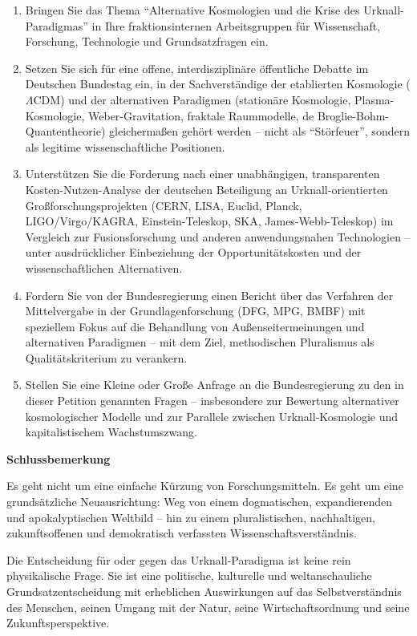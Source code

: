 \documentclass[11pt,a4paper]{letter}
\begin{document}
\begin{letter}
\begin{enumerate}
    \item Bringen Sie das Thema \enquote{Alternative Kosmologien und die Krise des Urknall-Paradigmas} in Ihre fraktionsinternen Arbeitsgruppen für Wissenschaft, Forschung, Technologie und Grundsatzfragen ein.
    
    \item Setzen Sie sich für eine offene, interdisziplinäre öffentliche Debatte im Deutschen Bundestag ein, in der Sachverständige der etablierten Kosmologie ($\Lambda$CDM) und der alternativen Paradigmen (stationäre Kosmologie, Plasma-Kosmologie, Weber-Gravitation, fraktale Raummodelle, de Broglie-Bohm-Quantentheorie) gleichermaßen gehört werden – nicht als \enquote{Störfeuer}, sondern als legitime wissenschaftliche Positionen.
    
    \item Unterstützen Sie die Forderung nach einer unabhängigen, transparenten Kosten-Nutzen-Analyse der deutschen Beteiligung an Urknall-orientierten Großforschungsprojekten (CERN, LISA, Euclid, Planck, LIGO/Virgo/KAGRA, Einstein-Teleskop, SKA, James-Webb-Teleskop) im Vergleich zur Fusionsforschung und anderen anwendungsnahen Technologien – unter ausdrücklicher Einbeziehung der Opportunitätskosten und der wissenschaftlichen Alternativen.
    
    \item Fordern Sie von der Bundesregierung einen Bericht über das Verfahren der Mittelvergabe in der Grundlagenforschung (DFG, MPG, BMBF) mit speziellem Fokus auf die Behandlung von Außenseitermeinungen und alternativen Paradigmen – mit dem Ziel, methodischen Pluralismus als Qualitätskriterium zu verankern.
    
    \item Stellen Sie eine Kleine oder Große Anfrage an die Bundesregierung zu den in dieser Petition genannten Fragen – insbesondere zur Bewertung alternativer kosmologischer Modelle und zur Parallele zwischen Urknall-Kosmologie und kapitalistischem Wachstumszwang.
\end{enumerate}

\noindent
\textbf{Schlussbemerkung}

Es geht nicht um eine einfache Kürzung von Forschungsmitteln. Es geht um eine grundsätzliche Neuausrichtung: Weg von einem dogmatischen, expandierenden und apokalyptischen Weltbild – hin zu einem pluralistischen, nachhaltigen, zukunftsoffenen und demokratisch verfassten Wissenschaftsverständnis.

Die Entscheidung für oder gegen das Urknall-Paradigma ist keine rein physikalische Frage. Sie ist eine politische, kulturelle und weltanschauliche Grundsatzentscheidung mit erheblichen Auswirkungen auf das Selbstverständnis des Menschen, seinen Umgang mit der Natur, seine Wirtschaftsordnung und seine Zukunftsperspektive.


\end{letter}
\end{document}
